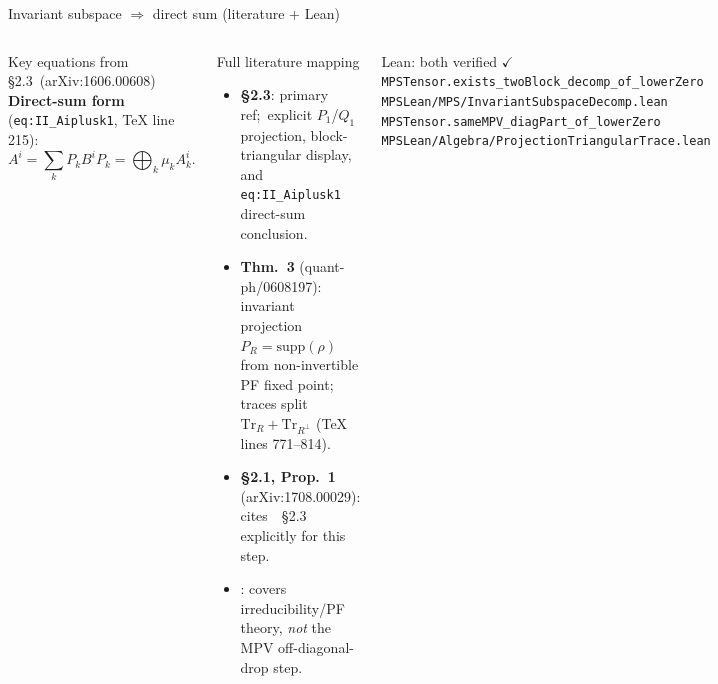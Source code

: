 \documentclass[aspectratio=169,10pt]{beamer}
\begin{document}
\begin{frame}{Invariant subspace $\Rightarrow$ direct sum (literature + Lean)}
\begin{columns}[T]
\begin{block}{Key equations from~\cite{Cirac2017Annals} \S2.3~(arXiv:1606.00608)}
            \textbf{Direct-sum form} (\texttt{eq:II\_Aiplusk1}, TeX line 215):
            \vspace{-0.2em}
            \[
                A^i = \sum_k P_k B^i P_k = \bigoplus_{k} \mu_k A_k^i.
            \]
        \end{block}

        \begin{block}{Full literature mapping}
            \begin{itemize}\itemsep0.15em
                \item[(a)] \textbf{\cite{Cirac2017Annals} \S2.3}: primary ref;\
                      explicit $P_1$/$Q_1$ projection, block-triangular display,
                      and \texttt{eq:II\_Aiplusk1} direct-sum conclusion.
                \item[(b)] \textbf{\cite{Perez-Garcia2007Matrix} Thm.~3} (quant-ph/0608197):
                      invariant projection $P_R = \mathrm{supp}(\rho)$ from
                      non-invertible PF fixed point;
                      traces split $\mathrm{Tr}_R + \mathrm{Tr}_{R^\perp}$
                      (TeX lines 771--814).
                \item[(c)] \textbf{\cite{Cirac2017Irreducible} \S2.1, Prop.~1}
                      (arXiv:1708.00029): cites~\cite{Cirac2017Annals}~\S2.3
                      explicitly for this step.
                \item[$\times$] \textcolor{dimwhite}{\footnotesize
                      \cite{Wolf2012Quantum}: covers irreducibility/PF theory,
                      \emph{not} the MPV off-diagonal-drop step.}
            \end{itemize}
        \end{block}

        \begin{block}{Lean: both verified $\checkmark$}
            {\scriptsize
            \texttt{MPSTensor.exists\_twoBlock\_decomp\_of\_lowerZero}\\
            \textcolor{dimwhite}{\texttt{MPSLean/MPS/InvariantSubspaceDecomp.lean}}\\[0.3em]
            \texttt{MPSTensor.sameMPV\_diagPart\_of\_lowerZero}\\
            \textcolor{dimwhite}{\texttt{MPSLean/Algebra/ProjectionTriangularTrace.lean}}
            }
        \end{block}
    \end{columns}
\end{frame}
\end{document}
